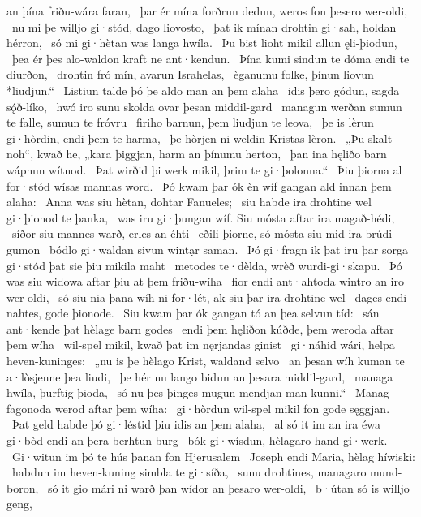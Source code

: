 an þína friðu-wára faran, \hld\ þar ér mína forðrun dedun,
weros fon þesero wer-oldi, \hld\ nu mi þe willjo gi·stód,
dago liovosto, \hld\ þat ik mínan drohtin gi·sah,
holdan hérron, \hld\ só mi gi·hètan was
langa hwíla. \hld\ Þu bist lioht mikil
allun ęli-þiodun, \hld\ þea ér þes alo-waldon
kraft ne ant·kendun. \hld\ Þína kumi sindun
te dóma endi te diurðon, \hld\ drohtin fró mín,
avarun Israhelas, \hld\ èganumu folke,
þínun liovun *liudjun.“ \hld\ Listiun talde þó
þe aldo man an þem alaha \hld\ idis þero gódun,
sagda sǫ́ð-líko, \hld\ hwó iro sunu skolda
ovar þesan middil-gard \hld\ managun werðan
sumun te falle, sumun te fróvru \hld\ firiho barnun,
þem liudjun te leova, \hld\ þe is lèrun gi·hòrdin,
endi þem te harma, \hld\ þe hòrjen ni weldin
Kristas lèron. \hld\ „Þu skalt noh“, kwað he, „kara þiggjan,
harm an þínumu herton, \hld\ þan ina hęliðo barn
wápnun wítnod. \hld\ Þat wirðid þi werk mikil,
þrim te gi·þolonna.“ \hld\ Þiu þiorna al for·stód
wísas mannas word. \hld\ Þó kwam þar ók èn wíf gangan
ald innan þem alaha: \hld\ Anna was siu hètan,
dohtar Fanueles; \hld\ siu habde ira drohtine wel
gi·þionod te þanka, \hld\ was iru gi·þungan wíf.
Siu mósta aftar ira magað-hédi, \hld\ síðor siu mannes warð,
erles an éhti \hld\ eðili þiorne,
só mósta siu mid ira brúdi-gumon \hld\ bódlo gi·waldan
sivun wintạr saman. \hld\ Þó gi·fragn ik þat iru þar sorga gi·stód
þat sie þiu mikila maht \hld\ metodes te·dèlda,
wrèð wurdi-gi·skapu. \hld\ Þó was siu widowa aftar þiu
at þem friðu-wíha \hld\ fior endi ant·ahtoda
wintro an iro wer-oldi, \hld\ só siu nia þana wíh ni for·lét,
ak siu þar ira drohtine wel \hld\ dages endi nahtes,
gode þionode. \hld\ Siu kwam þar ók gangan tó
an þea selvun tíd: \hld\ sán ant·kende
þat hèlage barn godes \hld\ endi þem hęliðon kúðde,
þem weroda aftar þem wíha \hld\ wil-spel mikil,
kwað þat im nęrjandas ginist \hld\ gi·náhid wári,
helpa heven-kuninges: \hld\ „nu is þe hèlago Krist,
waldand selvo \hld\ an þesan wíh kuman
te a·lòsjenne þea liudi, \hld\ þe hér nu lango bidun
an þesara middil-gard, \hld\ managa hwíla,
þurftig þioda, \hld\ só nu þes þinges mugun
mendjan man-kunni.“ \hld\ Manag fagonoda
werod aftar þem wíha: \hld\ gi·hòrdun wil-spel mikil
fon gode sęggjan. \hld\ Þat geld habde þó gi·léstid
þiu idis an þem alaha, \hld\ al só it im an ira éwa gi·bòd
endi an þera berhtun burg \hld\ bók gi·wísdun,
hèlagaro hand-gi·werk. \hld\ Gi·witun im þó te hús þanan
fon Hjerusalem \hld\ Joseph endi Maria,
hèlag híwiski: \hld\ habdun im heven-kuning
simbla te gi·síða, \hld\ sunu drohtines,
managaro mund-boron, \hld\ só it gio mári ni warð
þan wídor an þesaro wer-oldi, \hld\ b·útan só is willjo geng,
